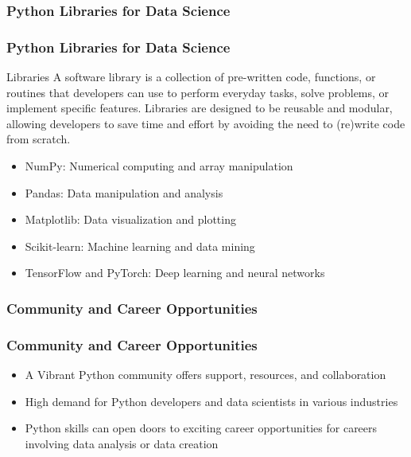 \documentclass{beamer}
\begin{document}
    \subsubsection{Python Libraries for Data Science}
    \begin{frame}
        \frametitle{Python Libraries for Data Science}
        \begin{block}{Libraries}
            A software library is a collection of pre-written code, functions, or routines that developers can use to perform everyday tasks, solve problems, or implement specific features. Libraries are designed to be reusable and modular, allowing developers to save time and effort by avoiding the need to (re)write code from scratch.
        \end{block}
        
        \begin{itemize}
            \item NumPy: Numerical computing and array manipulation
            \item Pandas: Data manipulation and analysis
            \item Matplotlib: Data visualization and plotting
            \item Scikit-learn: Machine learning and data mining
            \item TensorFlow and PyTorch: Deep learning and neural networks
        \end{itemize}
    \end{frame}
        
        
    \subsubsection{Community and Career Opportunities}
    \begin{frame}
        \frametitle{Community and Career Opportunities}
        \begin{itemize}
            \item A Vibrant Python community offers support, resources, and collaboration
            \item High demand for Python developers and data scientists in various industries
            \item Python skills can open doors to exciting career opportunities for careers involving data analysis or data creation
        \end{itemize}
    \end{frame}
        
\end{document}

